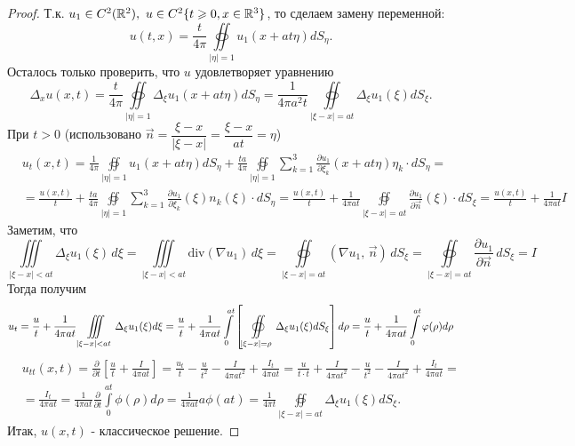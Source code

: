 \documentclass[../main.tex]{subfiles}
\begin{document}
\begin{proof}
Т.к. $u_1\in C^2(\R^2),\ u\in C^2\{t\geq 0, x\in\R^3\}$, то сделаем замену переменной:
\[
u(t, x)=\frac{t}{4\pi}\oiint\limits_{|\eta |=1}u_1(x+at\eta )dS_{\eta}.
\]
Осталось только проверить, что $u$ удовлетворяет уравнению
\[
\Delta_xu(x, t)=\frac{t}{4\pi}\oiint\limits_{|\eta |=1}\Delta_{\xi}u_1(x+at\eta )dS_{\eta}=\frac{1}{4\pi a^2t}\oiint\limits_{|\xi - x|=at}\Delta_{\xi}u_1(\xi )dS_{\xi}.
\]
При $t>0$ (использовано $\vec{n}=\dfrac{\xi - x}{|\xi - x|}=\dfrac{\xi - x}{at}=\eta$)
\begin{equation*}
\begin{split}
&u_t(x,t)=\frac{1}{4\pi}\oiint\limits_{|\eta |=1}u_1(x+at\eta )dS_{\eta}+\frac{ta}{4\pi}\oiint\limits_{|\eta |=1}\sum\limits_{k=1}^3 \frac{\partial u_1}{\partial \xi_k}(x+at\eta )\eta_k\cdot dS_{\eta}=\\
&=\frac{u(x, t)}{t}+\frac{ta}{4\pi}\oiint\limits_{|\eta |=1}\sum\limits_{k=1}^3 \frac{\partial u_1}{\partial \xi_k}(\xi )n_k(\xi )\cdot dS_{\eta}=\frac{u(x, t)}{t}+\frac{1}{4\pi at}\oiint\limits_{|\xi - x |=at}\frac{\partial u_1}{\partial \vec{n}}(\xi )\cdot dS_{\xi}=\frac{u(x, t)}{t} + \frac{1}{4\pi at}I
\end{split}
\end{equation*}
Заметим, что
\[
\iiint\limits_{|\xi - x|<at}\Delta_{\xi}u_1(\xi)\, d\xi =\iiint\limits_{|\xi - x|<at}\mathrm{div} (\nabla u_1)\, d\xi =\oiint\limits_{|\xi - x|=at} (\nabla u_1,\, \vec{n})\, dS_{\xi }=\oiint\limits_{|\xi - x|=at}\frac{\partial u_1}{\partial\vec{n}}\, dS_{\xi }=I
\]
Тогда получим 
$$
u_t=\frac{u}{t}+\frac{1}{4\pi at}\iiint\limits_{|\xi - x|<at}\Delta_{\xi}u_1(\xi )d\xi \\
= \frac{u}{t}+\frac{1}{4\pi at}\int\limits_0^{at} \left[\oiint\limits_{|\xi - x|=\rho}\Delta_{\xi}u_1(\xi )dS_{\xi}\right]d\rho \\
= \frac{u}{t}+\frac{1}{4\pi at}\int\limits_0^{at}\phi (\rho )d\rho
$$
\begin{equation*}
\begin{split}
&u_{tt}(x, t)=\frac{\partial}{\partial t}\left[\frac{u}{t}+\frac{I}{4\pi at} \right]=\frac{u_t}{t}-\frac{u}{t^2}-\frac{I}{4\pi at^2}+\frac{I_t}{4\pi at}=\frac{u}{t\cdot t}+\frac{I}{4\pi at^2}-\frac{u}{t^2}-\frac{I}{4\pi at^2}+\frac{I_t}{4\pi at}=\\
&=\frac{I_t}{4\pi at}=\frac{1}{4\pi at}\frac{\partial}{\partial t}\int\limits_0^{at}\phi (\rho )d\rho = \frac{1}{4\pi at}a\phi(at)=\frac{1}{4\pi t}\oiint\limits_{|\xi - x|=at}\Delta_{\xi}u_1(\xi )dS_{\xi}.
\end{split}
\end{equation*}
Итак, $u(x, t)$ - классическое решение.
\end{proof}
\end{document}
